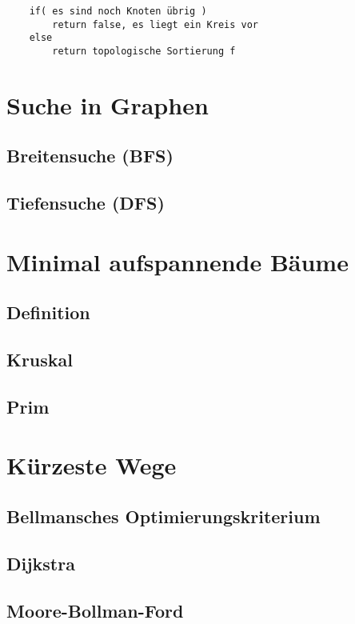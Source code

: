 \documentclass[10pt,a4paper,landscape]{article}
\begin{document}
\begin{multicols*}{2}
\begin{verbatim}
    if( es sind noch Knoten übrig )
        return false, es liegt ein Kreis vor
    else 
        return topologische Sortierung f
            \end{verbatim}

        \section{ Suche in Graphen }
            \subsection{ Breitensuche (BFS) }

            \subsection{ Tiefensuche (DFS) }


        \section{ Minimal aufspannende Bäume }
            \subsection{ Definition } 

            \subsection{ Kruskal }

            \subsection{ Prim }


        \section{ Kürzeste Wege }
            \subsection{ Bellmansches Optimierungskriterium }

            \subsection{ Dijkstra }

            \subsection{ Moore-Bollman-Ford }


\end{multicols*}
\end{document}
